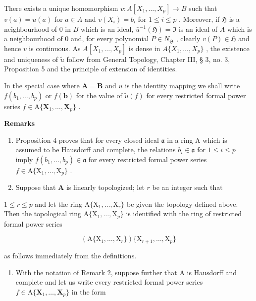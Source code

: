 There exists a unique homomorphism \(v \colon A[X_1, \ldots, X_p] \to B\) such that \(v(a) = u(a)\) for \(a \in A\) and \(v(X_i) = b_i\) for \(1 \leqslant i \leqslant p\) . Moreover, if \(\mathfrak{H}\) is a neighbourhood of 0 in \(B\) which is an ideal, \(\bar{u}^{-1}(\mathfrak{H}) = \mathfrak{I}\) is an ideal of \(A\) which is a neighbourhood of 0 and, for every polynomial \(P \in N_{\mathfrak{S}}\) , clearly \(v(P) \in \mathfrak{H}\) and hence \(v\) is continuous. As \(A[X_1, \ldots, X_p]\) is dense in \(A\{X_1, \ldots, X_p\}\) , the existence and uniqueness of \(\tilde{u}\) follow from General Topology, Chapter III, § 3, no. 3, Proposition 5 and the principle of extension of identities.

In the special case where \(\mathbf{A} = \mathbf{B}\) and \(u\) is the identity mapping we shall write \(f(b_{1},\ldots ,b_{p})\) or \(f(\mathbf{b})\) for the value of \(\tilde{u} (f)\) for every restricted formal power series \(f\in \mathrm{A}\{\mathbf{X}_1,\dots ,\mathbf{X}_p\}\) .

\textbf{Remarks}\par

\begin{enumerate}
\def\labelenumi{(\arabic{enumi})}
\item
  Proposition 4 proves that for every closed ideal \(\mathfrak{a}\) in a ring A which is assumed to be Hausdorff and complete, the relations \(b_{i} \in \mathfrak{a}\) for \(1 \leqslant i \leqslant p\) imply \(f(b_{1}, \ldots, b_{p}) \in \mathfrak{a}\) for every restricted formal power series \(f \in \mathrm{A}\{\mathrm{X}_{1}, \ldots, \mathrm{X}_{p}\}\) .
\item
  Suppose that \(\mathbf{A}\) is linearly topologized; let \(r\) be an integer such that
\end{enumerate}

\(1 \leqslant r \leqslant p\) and let the ring \(\mathrm{A}\{\mathrm{X}_1, \ldots, \mathrm{X}_r\}\) be given the topology defined above. Then the topological ring \(\mathrm{A}\{\mathrm{X}_1, \ldots, \mathrm{X}_p\}\) is identified with the ring of restricted formal power series

\[
(\mathrm{A} \{\mathrm{X} _ {1}, \dots , \mathrm{X} _ {r} \}) \{\mathrm{X} _ {r + 1}, \dots , \mathrm{X} _ {p} \}
\]

as follows immediately from the definitions.

\begin{enumerate}
\def\labelenumi{(\arabic{enumi})}
\setcounter{enumi}{2}
\tightlist
\item
  With the notation of Remark 2, suppose further that A is Hausdorff and complete and let us write every restricted formal power series \(f \in \mathrm{A}\{\mathbf{X}_1, \ldots, \mathbf{X}_p\}\) in the form
\end{enumerate}

